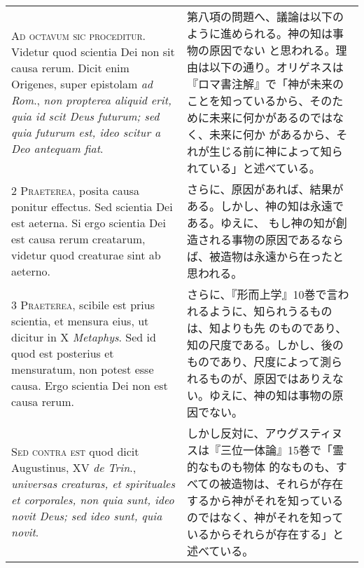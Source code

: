 \documentclass[10pt]{jsarticle} %
\begin{document}
\begin{longtable}{p{21em}p{21em}}

{\huge A}{\scshape d octavum sic proceditur}. Videtur quod scientia
Dei non sit causa rerum. Dicit enim Origenes, super epistolam
{\itshape ad Rom}., {\itshape non propterea aliquid erit, quia id scit
Deus futurum; sed quia futurum est, ideo scitur a Deo antequam fiat}.

&

第八項の問題へ、議論は以下のように進められる。神の知は事物の原因でない
と思われる。理由は以下の通り。オリゲネスは『ロマ書注解』で「神が未来の
ことを知っているから、そのために未来に何かがあるのではなく、未来に何か
があるから、それが生じる前に神によって知られている」と述べている。


\\


{\scshape 2 Praeterea}, posita causa ponitur effectus. Sed scientia
Dei est aeterna. Si ergo scientia Dei est causa rerum creatarum,
videtur quod creaturae sint ab aeterno.


&

さらに、原因があれば、結果がある。しかし、神の知は永遠である。ゆえに、
もし神の知が創造される事物の原因であるならば、被造物は永遠から在ったと
思われる。

\\


{\scshape 3 Praeterea}, scibile est prius scientia, et mensura eius,
ut dicitur in X {\itshape Metaphys}. Sed id quod est posterius et
mensuratum, non potest esse causa. Ergo scientia Dei non est causa
rerum.


&

さらに、『形而上学』10巻で言われるように、知られうるものは、知よりも先
のものであり、知の尺度である。しかし、後のものであり、尺度によって測ら
れるものが、原因ではありえない。ゆえに、神の知は事物の原因でない。

\\


{\scshape Sed contra est} quod dicit Augustinus, XV {\itshape de
Trin}., {\itshape universas creaturas, et spirituales et corporales,
non quia sunt, ideo novit Deus; sed ideo sunt, quia novit}.


&

しかし反対に、アウグスティヌスは『三位一体論』15巻で「霊的なものも物体
的なものも、すべての被造物は、それらが存在するから神がそれを知っている
のではなく、神がそれを知っているからそれらが存在する」と述べている。


\\



\end{longtable}
\end{document}
